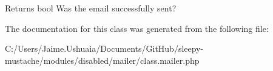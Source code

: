 \begin{DoxyReturn}{Returns}
bool Was the email successfully sent? 
\end{DoxyReturn}


The documentation for this class was generated from the following file\-:\begin{DoxyCompactItemize}
\item 
C\-:/\-Users/\-Jaime.\-Ushuaia/\-Documents/\-Git\-Hub/sleepy-\/mustache/modules/disabled/mailer/class.\-mailer.\-php\end{DoxyCompactItemize}
